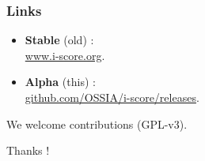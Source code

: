\documentclass[12pt,t]{beamer}
\begin{document}
\begin{frame}
    \frametitle{Links}
    \begin{itemize}
        \item \textbf{Stable} (old) :~\\ \url{www.i-score.org}.
        \item \textbf{Alpha} (this) :~\\ \url{github.com/OSSIA/i-score/releases}. 
    \end{itemize}
    
    We welcome contributions (GPL-v3).
    
    \centering
    \vspace{2cm}
    \Large{Thanks !}
\end{frame}
\end{document}
